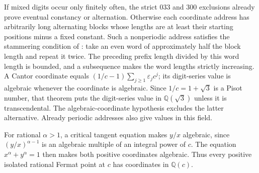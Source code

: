 If mixed digits occur only finitely often, the strict $033$ and $300$ exclusions already prove eventual constancy or alternation. Otherwise each coordinate address has arbitrarily long alternating blocks whose lengths are at least their starting positions minus a fixed constant. Such a nonperiodic address satisfies the stammering condition of \cite[Theorem~5]{AdamczewskiBugeaud2007}: take an even word of approximately half the block length and repeat it twice. The preceding prefix length divided by this word length is bounded, and a subsequence makes the word lengths strictly increasing. A Cantor coordinate equals $(1/c-1)\sum_{j\ge1}\varepsilon_jc^j$; its digit-series value is algebraic whenever the coordinate is algebraic. Since $1/c=1+\sqrt3$ is a Pisot number, that theorem puts the digit-series value in $\mathbb Q(\sqrt3)$ unless it is transcendental. The algebraic-coordinate hypothesis excludes the latter alternative. Already periodic addresses also give values in this field.

For rational $\alpha>1$, a critical tangent equation makes $y/x$ algebraic, since $(y/x)^{\alpha-1}$ is an algebraic multiple of an integral power of $c$. The equation $x^\alpha+y^\alpha=1$ then makes both positive coordinates algebraic. Thus every positive isolated rational Fermat point at $c$ has coordinates in $\mathbb Q(c)$.
